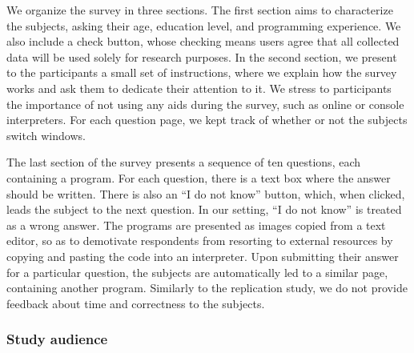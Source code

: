 We organize the survey in three sections. The first section aims to characterize the subjects, asking their age, education level, and programming experience. We also include a check button, whose checking means users agree that all collected data will be used solely for research purposes. In the second section, we present to the participants a small set of instructions, where we explain how the survey works and ask them to dedicate their attention to it. We stress to participants the importance of not using any aids during the survey, such as online or console interpreters. For each question page, we kept track of whether or not the subjects switch windows. 

The last section of the survey presents a sequence of ten questions, each containing a program. For each question, there is a text box where the answer should be written. There is also an ``I do not know'' button, which, when clicked, leads the subject to the next question. In our setting, ``I do not know'' is treated as a wrong answer. The programs are presented as images copied from a text editor, so as to demotivate respondents from resorting to external resources by copying and pasting the code into an interpreter. Upon submitting their answer for a particular question, the subjects are automatically led to a similar page, containing another program. Similarly to the replication study, we do not provide feedback about time and correctness to the subjects.




\subsubsection*{Study audience}


